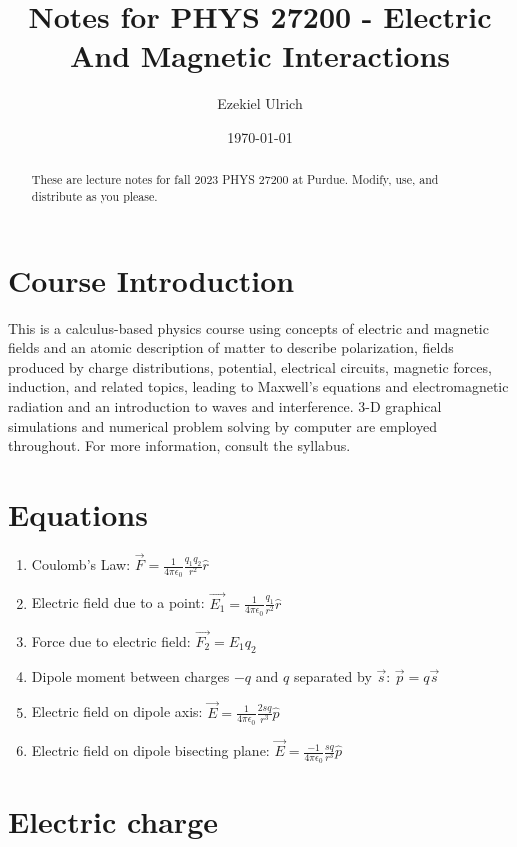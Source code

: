 \documentclass[nobib]{tufte-handout}
\title{Notes for PHYS 27200 - Electric And Magnetic Interactions}
\author[Ezekiel Ulrich]{Ezekiel Ulrich}
\date{\today}  %
\begin{document}
\maketitle

\begin{abstract}
These are lecture notes for fall 2023 PHYS 27200 at Purdue. Modify, use, and distribute as you please.
\end{abstract}

\tableofcontents

\section{Course Introduction}

This is a calculus-based physics course using concepts of electric and magnetic fields and an atomic description of
matter to describe polarization, fields produced by charge distributions, potential, electrical circuits,
magnetic forces, induction, and related topics, leading to Maxwell's equations and electromagnetic
radiation and an introduction to waves and interference. 3-D graphical simulations and numerical problem
solving by computer are employed throughout. For more information, consult the syllabus.

\section{Equations}

\begin{enumerate}
    \item Coulomb's Law: $\vec{F} = \frac{1}{4\pi \epsilon_0}\frac{q_1 q_2}{r^2}\hat{r}$
    \item Electric field due to a point: $\vec{E_1} = \frac{1}{4\pi \epsilon_0}\frac{q_1}{r^2}\hat{r}$
    \item Force due to electric field: $\vec{F_2} = E_1 q_2$
    \item Dipole moment between charges $-q$ and $q$ separated by $\vec{s}$: $\vec{p} = q\vec{s}$
    \item Electric field on dipole axis: $\vec{E} = \frac{1}{4\pi \epsilon_0}\frac{2sq}{r^3}\hat{p}$
    \item Electric field on dipole bisecting plane: $\vec{E} = \frac{-1}{4 \pi \epsilon_0}\frac{sq}{r^3}\hat{p}$
\end{enumerate}

\pagebreak

\section{Electric charge}
\end{document}
